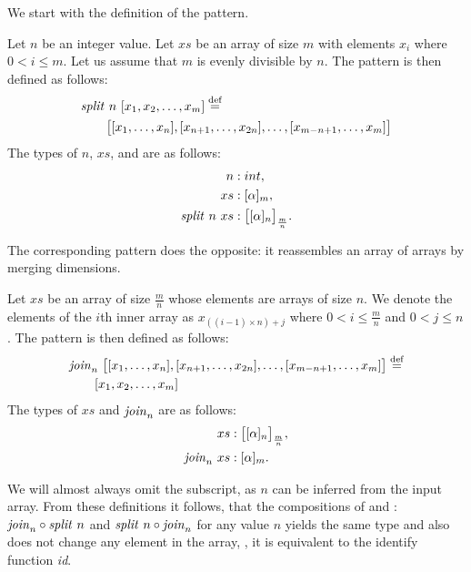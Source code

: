 We start with the definition of the \splitN pattern.
\begin{definition}
  \label{definition:pattern:split}
  Let $n$ be an integer value.
  Let $xs$ be an array of size $m$ with elements $x_i$ where $0 < i \leq m$.
  Let us assume that $m$ is evenly divisible by $n$.
  The \splitN pattern is then defined as follows:
  \begin{align*}
    &\text{\textit{split}}\ n\ [x_1, x_2, \dots, x_m] \stackrel{\textrm{\scriptsize def}}{=}\\
    &\qquad\big[[x_1, \ldots, x_n], [x_{n+1}, \ldots, x_{2n}], \ldots, [x_{m-n+1}, \ldots, x_m]\big]
  \end{align*}
  The types of $n$, $xs$, and \splitN are as follows:
  \begin{align*}
    n &: int,\\
    xs &: [\alpha]_m,\\
    \text{\textit{split}}\ n\ xs &: \big[[\alpha]_n\big]_{\frac{m}{n}} .
  \end{align*}
\end{definition}

\bigskip

\noindent
The corresponding \join pattern does the opposite:
it reassembles an array of arrays by merging dimensions.
\begin{definition}
  \label{definition:pattern:join}
  Let $xs$ be an array of size $\frac{m}{n}$ whose elements are arrays of size $n$.
  We denote the elements of the $i$th inner array as $x_{((i-1)\times n) + j}$ where $0 < i \leq \frac{m}{n}$ and $0 < j \leq n$.
  The \join pattern is then defined as follows:
  \begin{align*}
    &\text{\textit{join}}_n\ \big[[x_1, \ldots, x_n], [x_{n+1}, \ldots, x_{2n}], \ldots, [x_{m-n+1}, \ldots, x_m]\big] \stackrel{\textrm{\scriptsize def}}{=}\\
    &\qquad[x_1, x_2, \dots, x_m]
  \end{align*}
  The types of $xs$ and $\text{\textit{join}}_n$ are as follows:
  \begin{align*}
    xs &: \big[[\alpha]_n\big]_{\frac{m}{n}},\\
    \text{\textit{join}}_n\ xs &: [\alpha]_m .
  \end{align*}
\end{definition}

\noindent
We will almost always omit the subscript, as $n$ can be inferred from the input array.
From these definitions it follows, that the compositions of \splitN and \join: $\text{\textit{join}}_n \circ \text{\textit{split}}\ n$ and $\text{\textit{split}}\ n \circ \text{\textit{join}}_n$ for any value $n$ yields the same type and also does not change any element in the array, \ie, it is equivalent to the identify function \emph{id}.

